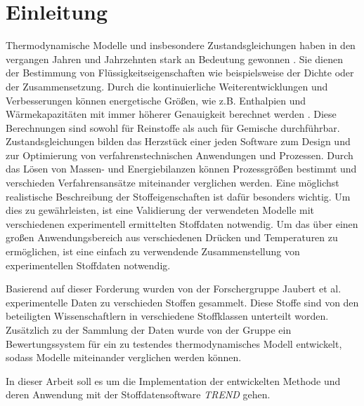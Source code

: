 \documentclass[../thesis.tex]{subfiles}
\begin{document}
\chapter{Einleitung}
\label{chp:Motivation}
Thermodynamische Modelle und insbesondere Zustandsgleichungen haben in den vergangen Jahren und Jahrzehnten stark an Bedeutung gewonnen \cite{ahlers2002development, stacey2000k}. Sie dienen der Bestimmung von Flüssigkeitseigenschaften wie beispielsweise der Dichte oder der Zusammensetzung. Durch die kontinuierliche Weiterentwicklungen und Verbesserungen können energetische Größen, wie z.B. Enthalpien und Wärmekapazitäten mit immer höherer Genauigkeit berechnet werden \cite{chen2002modification}. Diese Berechnungen sind sowohl für Reinstoffe als auch für Gemische durchführbar.
Zustandsgleichungen bilden das Herzstück einer jeden Software zum Design und zur Optimierung von verfahrenstechnischen Anwendungen und Prozessen. Durch das Lösen von Massen- und Energiebilanzen können Prozessgrößen bestimmt und verschieden Verfahrensansätze miteinander verglichen werden. Eine möglichst realistische Beschreibung der Stoffeigenschaften ist dafür besonders wichtig. Um dies zu gewährleisten, ist eine Validierung der verwendeten Modelle mit verschiedenen experimentell ermittelten Stoffdaten notwendig. Um das über einen großen Anwendungsbereich aus verschiedenen Drücken und Temperaturen zu ermöglichen, ist eine einfach zu verwendende Zusammenstellung von experimentellen Stoffdaten notwendig.

Basierend auf dieser Forderung wurden von der Forschergruppe Jaubert et al. \cite{jaubert2020benchmark} experimentelle Daten zu verschieden Stoffen gesammelt. Diese Stoffe sind von den beteiligten Wissenschaftlern in verschiedene Stoffklassen unterteilt worden. Zusätzlich zu der Sammlung der Daten wurde von der Gruppe ein Bewertungssystem für ein zu testendes thermodynamisches Modell entwickelt, sodass Modelle miteinander verglichen werden können.

In dieser Arbeit soll es um die Implementation der entwickelten Methode und deren Anwendung mit der Stoffdatensoftware \textit{TREND} gehen.
\end{document}
